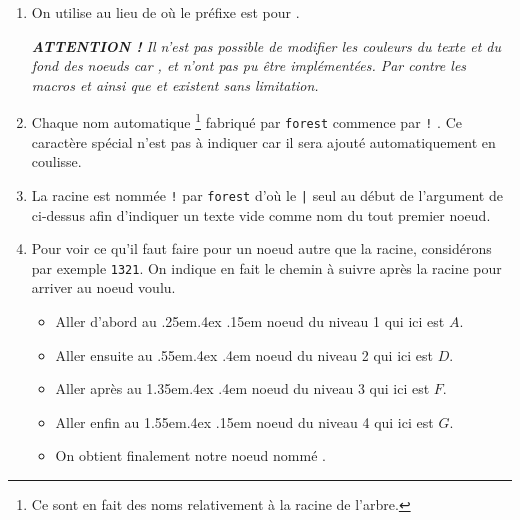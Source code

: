 \documentclass[12pt,a4paper]{article}
\begin{document}
\begin{enumerate}
	\item On utilise  au lieu de  où le préfixe  est pour .

		  \medskip
		  
		  {\itshape
		  		\textbf{ATTENTION !}
		  		Il n'est pas possible de modifier les couleurs du texte et du fond des noeuds car ,  et  n'ont pas pu être implémentées.
		  		Par contre les macros  et  ainsi que  et  existent sans limitation.
		  }

		  \medskip

	\item Chaque nom automatique
	      \footnote{
	      		Ce sont en fait des noms relativement à la racine de l'arbre.
	      }
	      fabriqué par \verb#forest# commence par \texttt{!} . Ce caractère spécial n'est pas à indiquer car il sera ajouté automatiquement en coulisse.

	
	\item La racine est nommée \texttt{!} par \verb#forest# d'où le \verb#|# seul au début de l'argument de  ci-dessus afin d'indiquer un texte vide comme nom du tout premier noeud.

	
	\item Pour voir ce qu'il faut faire pour un noeud autre que la racine, considérons par exemple \texttt{1321}. On indique en fait le chemin à suivre après la racine pour arriver au noeud voulu.
	\begin{itemize}
		\medskip
		
		\item Aller d'abord au
		      \kern.25em\kern.4ex\ier{}
		      \kern.15em
		      noeud du niveau 1 qui ici est $A$.

		\item Aller ensuite au
		      \kern.55em\kern.4ex\ieme{}
		      \kern.4em
		      noeud du niveau 2 qui ici est $D$.

		\item Aller après au
		      \kern1.35em\kern.4ex\ieme{}
		      \kern.4em
		      noeud du niveau 3 qui ici est $F$.
		
		\item Aller enfin au
		      \kern1.55em\kern.4ex\ier{}
		      \kern.15em
		      noeud du niveau 4 qui ici est $G$.
		      
		\medskip
		
		\item On obtient finalement notre noeud nommé .
	\end{itemize}
\end{enumerate}
\end{document}
